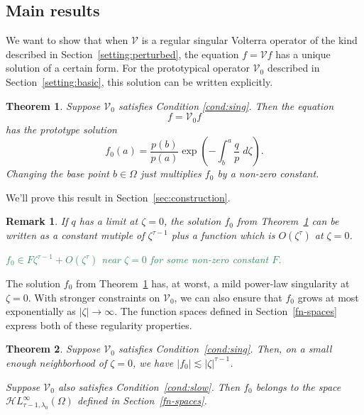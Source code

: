 \documentclass{article}
\theoremstyle{plain}
\newtheorem{thm}{Theorem}
\newtheorem{rmk}{Remark}
\newcommand{\singexp}[2]{\mathcal{H}L^\infty_{#1, #2}}
\newcommand{\volterra}{\mathcal{V}}
\newcommand{\hardpart}{\mathcal{V}_0}
\newcommand{\solproto}{f_0}
\newcommand{\domain}{\Omega}
\begin{document}
\subsection{Main results}\label{sec:results}
We want to show that when $\volterra$ is a regular singular Volterra operator of the kind described in Section~\ref{setting:perturbed}, the equation $f = \volterra f$ has a unique solution of a certain form. For the prototypical operator $\hardpart$ described in Section~\ref{setting:basic}, this solution can be written explicitly.
\begin{thm}\label{thm:basic_volterra}
Suppose $\hardpart$ satisfies {\em Condition \eqref{cond:sing}}. Then the equation
\[ f = \hardpart f \]
has the {\em prototype solution}
\begin{equation}\label{eqn:test_solution}
\solproto(a)=\frac{p(b)}{p(a)} \exp\left(-\int_{b}^{a}\frac{q}{p}\;d\zeta\right).
\end{equation}
Changing the base point $b \in \domain$ just multiplies $f_0$ by a non-zero constant.
\end{thm}
We'll prove this result in Section~\ref{sec:construction}.
\color{RoyalBlue}
\begin{rmk}
If $q$ has a limit at $\zeta = 0$, the solution $f_0$ from Theorem~\ref{thm:basic_volterra} can be written as a constant mutiple of $\zeta^{\tau-1}$ plus a function which is $O(\zeta^\tau)$ at $\zeta = 0$.

\textcolor{SeaGreen}{$f_0 \in F\zeta^{\tau-1} + O(\zeta^\tau)$ near $\zeta = 0$ for some non-zero constant $F$.}
\end{rmk}
\color{black}
The solution $\solproto$ from Theorem~\ref{thm:basic_volterra} has, at worst, a mild power-law singularity at $\zeta = 0$. With stronger constraints on $\hardpart$, we can also ensure that $\solproto$ grows at most exponentially as $|\zeta| \to \infty$. The function spaces defined in Section~\ref{fn-spaces} express both of these regularity properties.
\begin{thm}\label{thm:proto-growth}
Suppose $\hardpart$ satisfies {\em Condition~\eqref{cond:sing}}. Then, on a small enough neighborhood of $\zeta = 0$, we have $|\solproto| \lesssim |\zeta|^{\tau-1}$.

Suppose $\hardpart$ also satisfies {\em Condition~\eqref{cond:slow}}. Then $f_0$ belongs to the space $\singexp{\tau-1}{\lambda_0}(\domain)$ defined in Section~\ref{fn-spaces}.
\end{thm}
\end{document}
